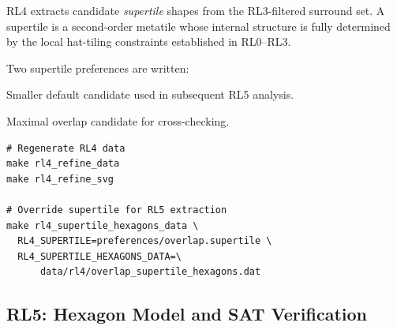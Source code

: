 \documentclass[10pt,a4paper]{article}
\let\polysubsection\subsection
\renewcommand\subsection{\needspace{0.12\textheight}\polysubsection}
\newcommand{\file}[1]{\texttt{\footnotesize #1}}
\begin{document}
\begin{tcolorbox}[dualbox, title=RL4 — Supertile Candidates — \file{src/rl4/}]
  RL4 extracts candidate \emph{supertile} shapes from the RL3-filtered
  surround set.  A supertile is a second-order metatile whose internal
  structure is fully determined by the local hat-tiling constraints
  established in RL0–RL3.

  Two supertile preferences are written:
  \begin{description}[leftmargin=0pt]
    \item[\file{preferences/focus.supertile}] Smaller default
      candidate used in subsequent RL5 analysis.
    \item[\file{preferences/overlap.supertile}] Maximal overlap
      candidate for cross-checking.
  \end{description}
\tcblower
\begin{verbatim}
# Regenerate RL4 data
make rl4_refine_data
make rl4_refine_svg

# Override supertile for RL5 extraction
make rl4_supertile_hexagons_data \
  RL4_SUPERTILE=preferences/overlap.supertile \
  RL4_SUPERTILE_HEXAGONS_DATA=\
      data/rl4/overlap_supertile_hexagons.dat
\end{verbatim}
\end{tcolorbox}

\subsection{RL5: Hexagon Model and SAT Verification}
\end{document}
